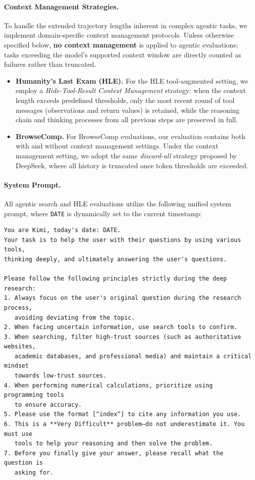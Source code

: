 \documentclass{article}
\begin{document}
\paragraph{Context Management Strategies.} 
To handle the extended trajectory lengths inherent in complex agentic tasks, we implement domain-specific context management protocols. Unless otherwise specified below, \textbf{no context management} is applied to agentic evaluations; tasks exceeding the model's supported context window are directly counted as failures rather than truncated.

\begin{itemize}
    \item \textbf{Humanity's Last Exam (HLE).} For the HLE tool-augmented setting, we employ a \textit{Hide-Tool-Result Context Management} strategy: when the context length exceeds predefined thresholds, only the most recent round of tool messages (observations and return values) is retained, while the reasoning chain and thinking processes from all previous steps are preserved in full.
    
    \item \textbf{BrowseComp.} For BrowseComp evaluations, our evaluation contains both with and without context management settings. Under the context management setting, we adopt the same \textit{discard-all} strategy proposed by DeepSeek, where all history is truncated once token thresholds are exceeded.
\end{itemize}
\paragraph{System Prompt.} 
All agentic search and HLE evaluations utilize the following unified system prompt, where \texttt{DATE} is dynamically set to the current timestamp:

{\small
\begin{verbatim}
You are Kimi, today's date: DATE.
Your task is to help the user with their questions by using various tools, 
thinking deeply, and ultimately answering the user's questions.

Please follow the following principles strictly during the deep research:
1. Always focus on the user's original question during the research process, 
   avoiding deviating from the topic.
2. When facing uncertain information, use search tools to confirm.
3. When searching, filter high-trust sources (such as authoritative websites, 
   academic databases, and professional media) and maintain a critical mindset 
   towards low-trust sources.
4. When performing numerical calculations, prioritize using programming tools 
   to ensure accuracy.
5. Please use the format [^index^] to cite any information you use.
6. This is a **Very Difficult** problem—do not underestimate it. You must use 
   tools to help your reasoning and then solve the problem.
7. Before you finally give your answer, please recall what the question is 
   asking for.
\end{verbatim}
}
\end{document}
